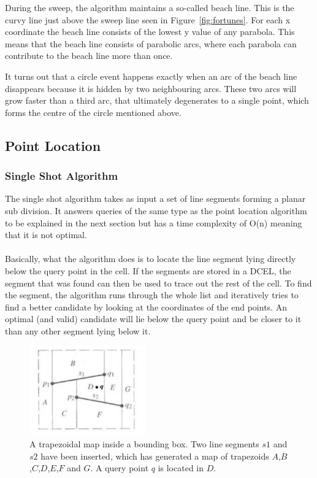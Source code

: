 During the sweep, the algorithm maintains a so-called beach line. This is the curvy line just above the sweep line seen in Figure~\ref{fig:fortunes}. For each x coordinate the beach line consists of the lowest y value of any parabola. This means that the beach line consists of parabolic arcs, where each parabola can contribute to the beach line more than once.

It turns out that a circle event happens exactly when an arc of the beach line disappears because it is hidden by two neighbouring arcs. These two arcs will grow faster than a third arc, that ultimately degenerates to a single point, which forms the centre of the circle mentioned above.

\subsection{Point Location}
\subsubsection{Single Shot Algorithm}
The single shot algorithm takes as input a set of line segments forming a planar sub division. It answers queries of the same type as the point location algorithm to be explained in the next section but has a time complexity of O(n) meaning that it is not optimal. 

\paragraph{}
Basically, what the algorithm does is to locate the line segment lying directly below the query point in the cell. If the segments are stored in a DCEL, the segment that was found can then be used to trace out the rest of the cell. To find the segment, the algorithm runs through the whole list and iteratively tries to find a better candidate by looking at the coordinates of the end points. An optimal (and valid) candidate will lie below the query point and be closer to it than any other segment lying below it. 

\begin{figure}[]
    \centering
      \includegraphics[width=50mm]{images/trapezoidal_map.pdf}
    \caption{A trapezoidal map inside a bounding box. Two line segments $s1$ and $s2$ have been inserted, which has generated a map of trapezoids $A$,$B$,$C$,$D$,$E$,$F$ and $G$. A query point $q$ is located in $D$.}
    \label{fig:trapezoidal_map}
\end{figure}


